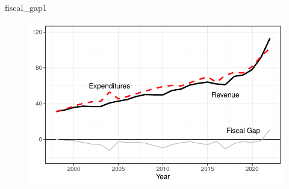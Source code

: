 \documentclass[
  letterpaper,
  DIV=11,
  numbers=noendperiod]{scrreport}
\newenvironment{Shaded}{\begin{snugshade}}{\end{snugshade}}
\newcommand{\NormalTok}[1]{\textcolor[rgb]{0.00,0.23,0.31}{#1}}
\begin{document}
\begin{Shaded}
\begin{Highlighting}[]
\NormalTok{fiscal\_gap1}
\end{Highlighting}
\end{Shaded}

\begin{figure}[H]

{\centering \includegraphics{./Everything_files/figure-pdf/unnamed-chunk-25-1.pdf}

}

\end{figure}
\end{document}
